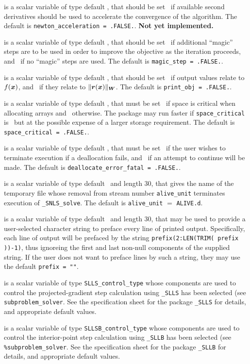 \documentclass{galahad}
\newcommand{\packagename}{SNLS}
\newcommand{\fullpackagename}{\libraryname\_\packagename}
\newcommand{\solver}{{\tt \fullpackagename\_solve}}
\begin{document}
\begin{description}
is a scalar variable of type default \logical,
that should be set \true\ if available  second derivatives should 
be used to accelerate the convergence of the algorithm.
The default is {\tt newton\_acceleration = .FALSE.}.
{\bf Not yet implemented.}

is a scalar variable of type default \logical,
that should be set \true\ if additional ``magic'' steps are to be
used in order to improve the objective as the iteration proceeds,
and \false\ if no ``magic'' steps are used.
The default is {\tt magic\_step = .FALSE.}.

is a scalar variable of type default \logical,
that should be set \true\ if output values relate to $f({\bm{x}})$,
and \false\ if they relate to $\|{\bm{r}}({\bm{x}})\|_{{\bm{W}}}$.
The default is {\tt print\_obj = .FALSE.}.

 is a scalar variable of type default \logical,
that must be set \true\ if space is critical when allocating arrays
and  \false\ otherwise. The package may run faster if
{\tt space\_critical} is \false\ but at the possible expense of a larger
storage requirement. The default is {\tt space\_critical = .FALSE.}.

 is a scalar variable of type default \logical,
that must be set \true\ if the user wishes to terminate execution if
a deallocation  fails, and \false\ if an attempt to continue
will be made. The default is {\tt deallocate\_error\_fatal = .FALSE.}.

 is a scalar variable of type default \character\ and length
30, that gives the name of the temporary file whose removal from stream number
{\tt alive\_unit} terminates execution of \solver.
The default is {\tt alive\_unit} $=$ {\tt ALIVE.d}.

 is a scalar variable of type default \character\
and length 30, that may be used to provide a user-selected
character string to preface every line of printed output.
Specifically, each line of output will be prefaced by the string
{\tt prefix(2:LEN(TRIM( prefix ))-1)},
thus ignoreing the first and last non-null components of the
supplied string. If the user does not want to preface lines by such
a string, they may use the default {\tt prefix = ""}.

 is a scalar variable of type
{\tt SLLS\_control\_type}
whose components are used to control
the projected-gradient step calculation using
{\tt \libraryname\_SLLS} has been selected (see {\tt subproblem\_solver}.
See the specification sheet for the package
{\tt \libraryname\_SLLS}
for details, and appropriate default values.

 is a scalar variable of type
{\tt SLLSB\_control\_type}
whose components are used to control
the interior-point step calculation using
{\tt \libraryname\_SLLB} has been selected (see {\tt \%subproblem\_solver}.
See the specification sheet for the package
{\tt \libraryname\_SLLB}
for details, and appropriate default values.

\end{description}
\end{document}
